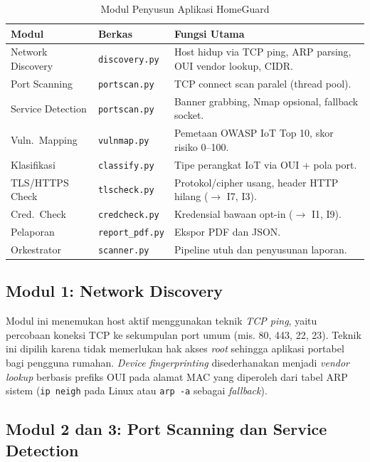 \documentclass[conference]{IEEEtran}
\begin{document}
\begin{table}[htbp]
\caption{Modul Penyusun Aplikasi HomeGuard}
\label{tab:modul}
\renewcommand{\arraystretch}{1.2}
\begin{tabularx}{\columnwidth}{|l|l|X|}
\hline
\textbf{Modul} & \textbf{Berkas} & \textbf{Fungsi Utama} \\
\hline
Network Discovery   & \texttt{discovery.py}   & Host hidup via TCP ping, ARP parsing, OUI vendor lookup, CIDR. \\
\hline
Port Scanning       & \texttt{portscan.py}    & TCP connect scan paralel (thread pool). \\
\hline
Service Detection   & \texttt{portscan.py}    & Banner grabbing, Nmap opsional, fallback socket. \\
\hline
Vuln.\ Mapping      & \texttt{vulnmap.py}     & Pemetaan OWASP IoT Top 10, skor risiko 0--100. \\
\hline
Klasifikasi         & \texttt{classify.py}    & Tipe perangkat IoT via OUI + pola port. \\
\hline
TLS/HTTPS Check     & \texttt{tlscheck.py}    & Protokol/cipher usang, header HTTP hilang ($\to$ I7, I3). \\
\hline
Cred.\ Check        & \texttt{credcheck.py}   & Kredensial bawaan opt-in ($\to$ I1, I9). \\
\hline
Pelaporan           & \texttt{report\_pdf.py} & Ekspor PDF dan JSON. \\
\hline
Orkestrator         & \texttt{scanner.py}     & Pipeline utuh dan penyusunan laporan. \\
\hline
\end{tabularx}
\end{table}

\subsection{Modul 1: Network Discovery}

Modul ini menemukan host aktif menggunakan teknik \textit{TCP ping},
yaitu percobaan koneksi TCP ke sekumpulan port umum (mis. 80, 443, 22,
23). Teknik ini dipilih karena tidak memerlukan hak akses \textit{root}
sehingga aplikasi portabel bagi pengguna rumahan. \textit{Device
fingerprinting} disederhanakan menjadi \textit{vendor lookup} berbasis
prefiks OUI pada alamat MAC yang diperoleh dari tabel ARP sistem
(\texttt{ip neigh} pada Linux atau \texttt{arp -a} sebagai
\textit{fallback}).

\subsection{Modul 2 dan 3: Port Scanning dan Service Detection}
\end{document}

